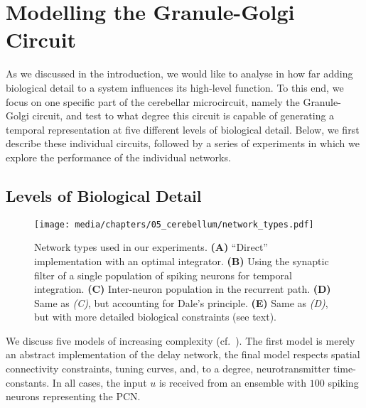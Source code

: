 
\section{Modelling the Granule-Golgi Circuit}
\label{sec:cerebellum_golgi_granule}

As we discussed in the introduction, we would like to analyse in how far adding biological detail to a system influences its high-level function.
To this end, we focus on one specific part of the cerebellar microcircuit, namely the Granule-Golgi circuit, and test to what degree this circuit is capable of generating a temporal representation at five different levels of biological detail.
Below, we first describe these individual circuits, followed by a series of experiments in which we explore the performance of the individual networks.

\subsection{Levels of Biological Detail}
\label{sec:cerebellum_levels}

\begin{figure}
	\centering
	\texttt{[image: media/chapters/05\_cerebellum/network\_types.pdf]}%
	{\label{fig:cerebellum_network_types_a}}%
	{\label{fig:cerebellum_network_types_b}}%
	{\label{fig:cerebellum_network_types_c}}%
	{\label{fig:cerebellum_network_types_d}}%
	{\label{fig:cerebellum_network_types_e}}%
	\caption[Network types used in the cerebellum experiments.]{Network types used in our experiments. \textbf{(A)} \enquote{Direct} implementation with an optimal integrator. \textbf{(B)} Using the synaptic filter of a single population of spiking neurons for temporal integration. \textbf{(C)} Inter-neuron population in the recurrent path. \textbf{(D)} Same as \emph{(C)}, but accounting for Dale's principle. \textbf{(E)} Same as \emph{(D)}, but with more detailed biological constraints (see text).}
	\label{fig:cerebellum_network_types}
\end{figure}

We discuss five models of increasing complexity (cf.~).
The first model is merely an abstract implementation of the delay network, the final model respects spatial connectivity constraints, tuning curves, and, to a degree, neurotransmitter time-constants.
In all cases, the input $u$ is received from an \NEF ensemble with $100$ spiking \LIF neurons representing the PCN.

